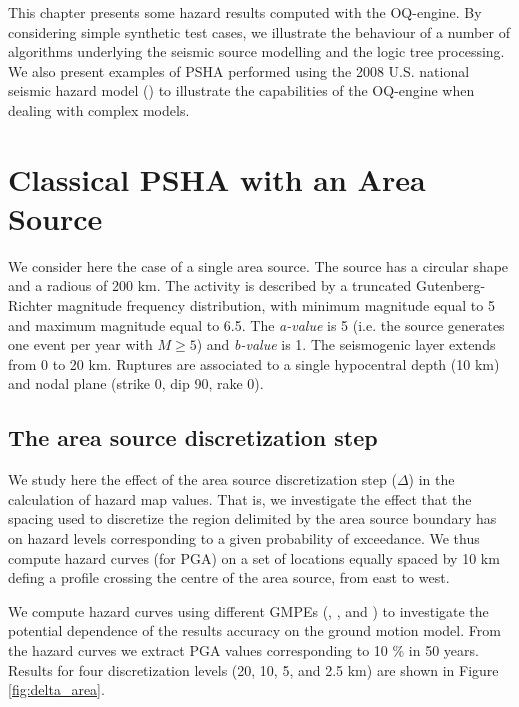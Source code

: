 This chapter presents some hazard results computed with the OQ-engine. By
considering simple synthetic test cases, we illustrate the behaviour of a number
of algorithms underlying the seismic source modelling and the logic tree
processing. We also present examples of PSHA performed using the 2008 
U.S. national seismic hazard model (\cite{petersen2008}) to illustrate the
capabilities of the OQ-engine when dealing with complex models.
%
\section{Classical PSHA with an Area Source} 
We consider here the case of a single area source. The source has a circular
shape and a radious of 200 km.  The activity is described by a truncated
Gutenberg-Richter magnitude frequency distribution, with minimum magnitude equal
to 5 and maximum magnitude equal to 6.5. The \textit{a-value} is 5 (i.e. the
source generates one event per year with $M \ge 5$) and \textit{b-value} is 1.
The seismogenic layer extends from 0 to 20 km.  Ruptures are associated to a
single hypocentral depth (10 km) and nodal plane (strike 0, dip 90, rake 0).
%
\subsection{The area source discretization step} 
We study here the effect of the area source discretization step ($\Delta$) in
the calculation of hazard map values. That is, we investigate the effect that
the spacing used to discretize the region delimited by the area source boundary
has on hazard levels corresponding to a given probability of exceedance. We thus
compute hazard curves (for PGA) on a set of locations equally spaced by 10 km
defing a profile crossing the centre of the area source, from east to west.

We compute hazard curves using different GMPEs (\cite{boore2008},
\cite{chiou2008}, \cite{campbell2008} and \cite{abrahamson2008}) to investigate
the potential dependence of the results accuracy on the ground motion model.
From the hazard curves we extract PGA values corresponding to 10 \% in 50 years.
Results for four discretization levels (20, 10, 5, and 2.5 km) are shown in
Figure \ref{fig:delta_area}. 

